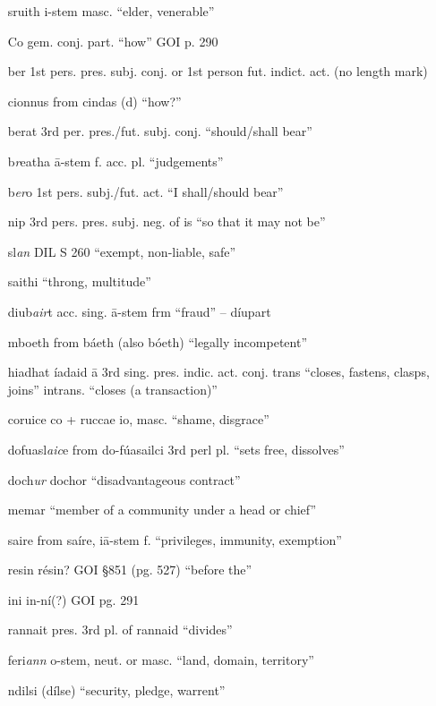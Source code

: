 \documentclass[11pt]{article}
\begin{document}
\begin{enumerate}
  \item[sruith] i-stem masc. \enquote{elder, venerable}
  \item[Co] gem. conj. part. \enquote{how} GOI p. 290
  \item[ber] 1st pers. pres. subj. conj. or 1st person fut. indict. act. (no length mark)
  \item[cionnus] from cindas (d) \enquote{how?}
  \item[berat] 3rd per. pres./fut. subj. conj. \enquote{should/shall bear}
  \item[b\emph{r}eatha] \={a}-stem f. acc. pl. \enquote{judgements}
  \item[b\emph{er}o] 1st pers. subj./fut. act. \enquote{I shall/should bear} 
  \item[nip] 3rd pers. pres. subj. neg. of is \enquote{so that it may not be}
  \item[sl\emph{an}] DIL S 260 \enquote{exempt, non-liable, safe}
  \item[saithi] \enquote{throng, multitude}
  \item[diub\emph{air}t] acc. sing. \={a}-stem frm \enquote{fraud} -- d\'{i}upart
  \item[mboeth] from b\'{a}eth (also b\'{o}eth) \enquote{legally incompetent}
  \item[hiadhat] \'{i}adaid \={a} 3rd sing. pres. indic. act. conj. trans \enquote{closes, fastens, clasps, joins} intrans. \enquote{closes (a transaction)}
  \item[coruice] co + ruccae io, masc. \enquote{shame, disgrace}
  \item[dofuasl\emph{aic}e] from do-f\'{u}asailci 3rd perl pl. \enquote{sets free, dissolves}
  \item[doch\emph{ur}] dochor \enquote{disadvantageous contract}
  \item[memar] \enquote{member of a community under a head or chief}
  \item[saire] from sa\'{i}re, i\={a}-stem f. \enquote{privileges, immunity, exemption}
  \item[resin] r\'{e}sin? GOI \S 851 (pg. 527) \enquote{before the}
  \item[ini] in-n\'{i}(?) GOI pg. 291
  \item[rannait] pres. 3rd pl. of rannaid \enquote{divides}
  \item[feri\emph{ann}] o-stem, neut. or masc. \enquote{land, domain, territory}
  \item[ndilsi] (d\'{i}lse) \enquote{security, pledge, warrent}

\end{enumerate}
\end{document}
